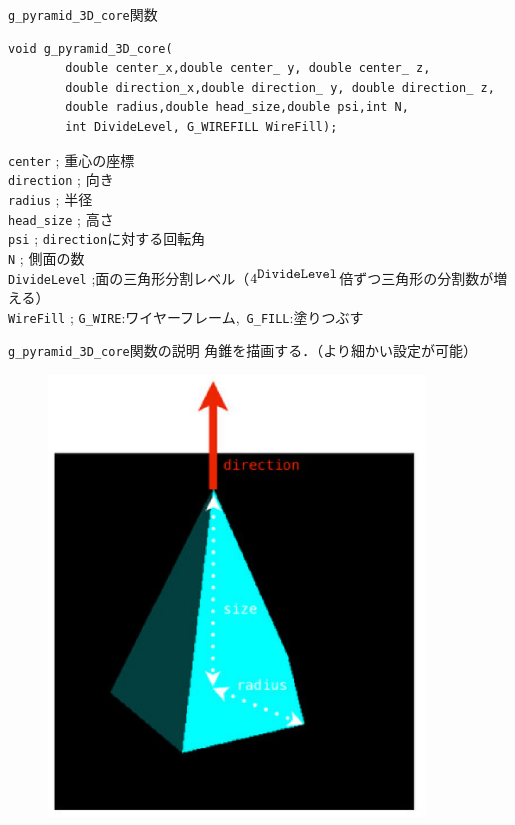 \documentclass[a4paper,12pt]{jsarticle}%
\begin{document}
\begin{itembox}[l]{\texttt{g\_pyramid\_3D\_core}関数}
\begin{verbatim}
void g_pyramid_3D_core(
        double center_x,double center_ y, double center_ z,
        double direction_x,double direction_ y, double direction_ z,
        double radius,double head_size,double psi,int N,
        int DivideLevel, G_WIREFILL WireFill);
\end{verbatim}
\verb|center| ; 重心の座標\\
\verb|direction| ; 向き\\
\verb|radius| ; 半径\\
\verb|head_size| ; 高さ\\
\verb|psi| ; \verb|direction|に対する回転角\\
\verb|N| ; 側面の数\\
\verb|DivideLevel| ;面の三角形分割レベル（$4^{\verb|DivideLevel|}$倍ずつ三角形の分割数が増える）\\
\verb|WireFill| ; \verb|G_WIRE|:ワイヤーフレーム,\ \verb|G_FILL|:塗りつぶす \\
\end{itembox}

\begin{itembox}[l]{\texttt{g\_pyramid\_3D\_core}関数の説明}
角錐を描画する．（より細かい設定が可能）
\end{itembox}

\begin{figure}[htb]
	\includegraphics[width=100mm]{./Figures/eps/Canvas_g_pyramid.eps}
\end{figure}
\end{document}
